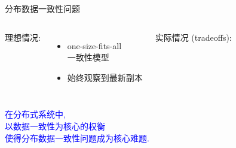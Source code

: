 \begin{frame}{分布数据一致性问题}
  \begin{columns}[t]
	  理想情况:
	  \begin{itemize}
		\item one-size-fits-all\\一致性模型
		\item 始终观察到最新副本
	  \end{itemize}
    \pause
	实际情况 (tradeoffs):
  \end{columns}
  \pause
  \vspace{0.50cm}
  \begin{center}
	\textcolor{blue}{在分布式系统中, \\以数据一致性为核心的权衡  \\
  		使得分布数据一致性问题成为核心难题.}
  \end{center}
\end{frame}
%       
